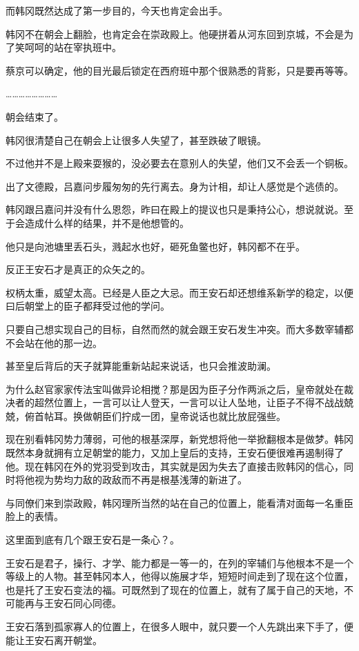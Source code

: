 而韩冈既然达成了第一步目的，今天也肯定会出手。

韩冈不在朝会上翻脸，也肯定会在崇政殿上。他硬拼着从河东回到京城，不会是为了笑呵呵的站在宰执班中。

蔡京可以确定，他的目光最后锁定在西府班中那个很熟悉的背影，只是要再等等。

……………………

朝会结束了。

韩冈很清楚自己在朝会上让很多人失望了，甚至跌破了眼镜。

不过他并不是上殿来耍猴的，没必要去在意别人的失望，他们又不会丢一个铜板。

出了文德殿，吕嘉问步履匆匆的先行离去。身为计相，却让人感觉是个逃债的。

韩冈跟吕嘉问并没有什么恩怨，昨曰在殿上的提议也只是秉持公心，想说就说。至于会造成什么样的结果，并不是他想管的。

他只是向池塘里丢石头，溅起水也好，砸死鱼鳖也好，韩冈都不在乎。

反正王安石才是真正的众矢之的。

权柄太重，威望太高。已经是人臣之大忌。而王安石却还想维系新学的稳定，以便曰后朝堂上的臣子都拜受过他的学问。

只要自己想实现自己的目标，自然而然的就会跟王安石发生冲突。而大多数宰辅都不会站在他的那一边。

甚至皇后背后的天子就算能重新站起来说话，也只会推波助澜。

为什么赵官家家传法宝叫做异论相搅？那是因为臣子分作两派之后，皇帝就处在裁决者的超然位置上，一言可以让人登天，一言可以让人坠地，让臣子不得不战战兢兢，俯首帖耳。换做朝臣们拧成一团，皇帝说话也就比放屁强些。

现在别看韩冈势力薄弱，可他的根基深厚，新党想将他一举掀翻根本是做梦。韩冈既然本身就拥有立足朝堂的能力，又加上皇后的支持，王安石便很难再遏制得了他。现在韩冈在外的党羽受到攻击，其实就是因为失去了直接击败韩冈的信心，同时将他视为势均力敌的政敌而不再是根基浅薄的新进了。

与同僚们来到崇政殿，韩冈理所当然的站在自己的位置上，能看清对面每一名重臣脸上的表情。

这里面到底有几个跟王安石是一条心？。

王安石是君子，操行、才学、能力都是一等一的，在列的宰辅们与他根本不是一个等级上的人物。甚至韩冈本人，他得以施展才华，短短时间走到了现在这个位置，也是托了王安石变法的福。可既然到了现在的位置上，就有了属于自己的天地，不可能再与王安石同心同德。

王安石落到孤家寡人的位置上，在很多人眼中，就只要一个人先跳出来下手了，便能让王安石离开朝堂。

